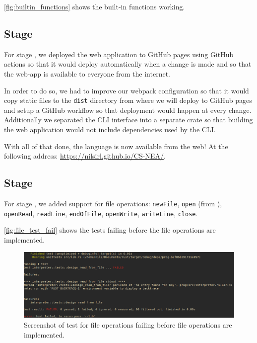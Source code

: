 \documentclass{article}
\newcommand{\subsecnum}{\the\value{subsection}}
\begin{document}
\autoref{fig:builtin_functions} shows the built-in functions working.

\subsection{Stage \subsecnum}

For stage \subsecnum, we deployed the web application to GitHub pages using GitHub
actions so that it would deploy automatically when a change is made and so that
the web-app is available to everyone from the internet.

In order to do so, we had to improve our webpack configuration so that it would
copy static files to the \texttt{dist} directory from where we will deploy to
GitHub pages and setup a GitHub workflow so that deployment would happen at
every change. Additionally we separated the CLI interface into a separate crate
so that building the web application would not include dependencies used by the
CLI.

With all of that done, the language is now available from the web! At the
following address: \url{https://nilsirl.github.io/CS-NEA/}.

\subsection{Stage \subsecnum}

For stage \subsecnum, we added support for file operations: \texttt{newFile},
\texttt{open} (from ), \texttt{openRead}, \texttt{readLine},
\texttt{endOfFile}, \texttt{openWrite}, \texttt{writeLine}, \texttt{close}.

\autoref{fig:file_test_fail} shows the tests failing before the file operations
are implemented.

\begin{figure}
	\includegraphics[width=\textwidth]{file_test_fail}
	\caption{Screenshot of test for file operations failing before file
	operations are implemented.}
	\label{fig:file_test_fail}
\end{figure}
\end{document}
